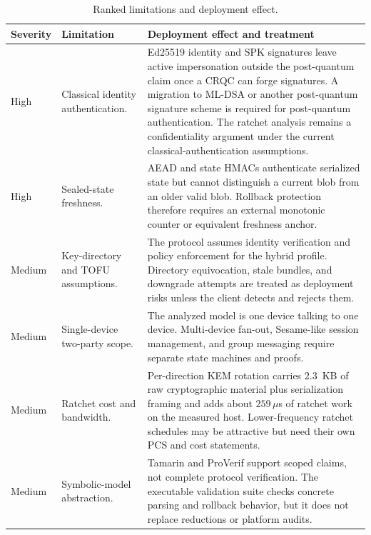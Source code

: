 \documentclass[preprint,12pt]{elsarticle}
\theoremstyle{definition}
\begin{document}
\begin{table}[H]
\centering
\caption{Ranked limitations and deployment effect.}
\label{tab:limitations}
\footnotesize
\begin{tabularx}{\textwidth}{@{}L{0.16\textwidth}L{0.24\textwidth}Y@{}}
\toprule
Severity & Limitation & Deployment effect and treatment \\
\midrule
High & Classical identity authentication. & Ed25519 identity and SPK signatures leave active impersonation outside the post-quantum claim once a CRQC can forge signatures. A migration to ML-DSA or another post-quantum signature scheme is required for post-quantum authentication. The ratchet analysis remains a confidentiality argument under the current classical-authentication assumptions. \\
High & Sealed-state freshness. & AEAD and state HMACs authenticate serialized state but cannot distinguish a current blob from an older valid blob. Rollback protection therefore requires an external monotonic counter or equivalent freshness anchor. \\
Medium & Key-directory and TOFU assumptions. & The protocol assumes identity verification and policy enforcement for the hybrid profile. Directory equivocation, stale bundles, and downgrade attempts are treated as deployment risks unless the client detects and rejects them. \\
Medium & Single-device two-party scope. & The analyzed model is one device talking to one device. Multi-device fan-out, Sesame-like session management, and group messaging require separate state machines and proofs. \\
Medium & Ratchet cost and bandwidth. & Per-direction KEM rotation carries 2.3~KB of raw cryptographic material plus serialization framing and adds about $259\,\mu$s of ratchet work on the measured host. Lower-frequency ratchet schedules may be attractive but need their own PCS and cost statements. \\
Medium & Symbolic-model abstraction. & Tamarin and ProVerif support scoped claims, not complete protocol verification. The executable validation suite checks concrete parsing and rollback behavior, but it does not replace reductions or platform audits. \\
\bottomrule
\end{tabularx}
\end{table}


\end{document}
